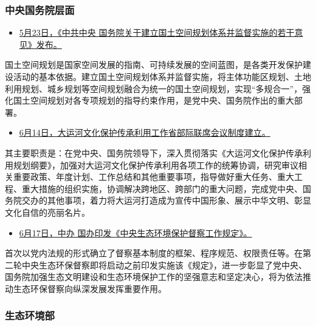 \documentclass[]{book}
\providecommand{\tightlist}{%
  \setlength{\itemsep}{0pt}\setlength{\parskip}{0pt}}
\begin{document}
\hypertarget{ux4e2dux592eux56fdux52a1ux9662ux5c42ux9762-3}{%
\subsubsection*{中央国务院层面}\label{ux4e2dux592eux56fdux52a1ux9662ux5c42ux9762-3}}

\begin{itemize}
\tightlist
\item
  \href{http://www.gov.cn/xinwen/2019-05/23/content_5394187.htm}{5月23日，《中共中央 国务院关于建立国土空间规划体系并监督实施的若干意见》发布。}
\end{itemize}

国土空间规划是国家空间发展的指南、可持续发展的空间蓝图，是各类开发保护建设活动的基本依据。建立国土空间规划体系并监督实施，将主体功能区规划、土地利用规划、城乡规划等空间规划融合为统一的国土空间规划，实现``多规合一''，强化国土空间规划对各专项规划的指导约束作用，是党中央、国务院作出的重大部署。

\begin{itemize}
\tightlist
\item
  \href{https://mp.weixin.qq.com/s/fzrm-jPCCsxRzPWU5TMA6A}{6月14日，大运河文化保护传承利用工作省部际联席会议制度建立。}
\end{itemize}

其主要职责是：在党中央、国务院领导下，深入贯彻落实《大运河文化保护传承利用规划纲要》，加强对大运河文化保护传承利用各项工作的统筹协调，研究审议相关重要政策、年度计划、工作总结和其他重要事项，指导做好重大任务、重大工程、重大措施的组织实施，协调解决跨地区、跨部门的重大问题，完成党中央、国务院交办的其他事项，着力将大运河打造成为宣传中国形象、展示中华文明、彰显文化自信的亮丽名片。

\begin{itemize}
\tightlist
\item
  \href{http://www.gov.cn/xinwen/2019-06/17/content_5401085.htm}{6月17日，中办 国办印发《中央生态环境保护督察工作规定》。}
\end{itemize}

首次以党内法规的形式确立了督察基本制度的框架、程序规范、权限责任等。在第二轮中央生态环保督察即将启动之前印发实施该《规定》，进一步彰显了党中央、国务院加强生态文明建设和生态环境保护工作的坚强意志和坚定决心，将为依法推动生态环保督察向纵深发展发挥重要作用。

\hypertarget{ux751fux6001ux73afux5883ux90e8-4}{%
\subsubsection*{生态环境部}\label{ux751fux6001ux73afux5883ux90e8-4}}
\end{document}
